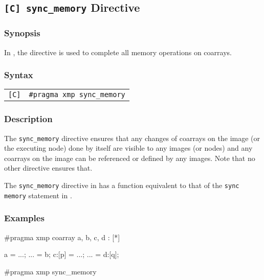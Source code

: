 \subsection{{\tt [C] sync\_memory} Directive}

\subsubsection*{Synopsis}

In {\XMPC}, the  directive is used to complete
all memory operations on coarrays.

\subsubsection*{Syntax}

\begin{tabular}{ll}
\verb![C]! & \verb|#pragma xmp sync_memory| \\
\end{tabular}

\subsubsection*{Description}


The {\tt sync\_memory} directive ensures that any changes of coarrays
on the image (or the executing node) done by itself are visible to any
images (or nodes) and any coarrays on the image can be referenced or
defined by any images.
%
Note that no other {\XMP} directive ensures that.

The {\tt sync\_memory} directive in {\XMPC} has a function equivalent
to that of the {\tt sync memory} statement in {\XMPF}.

\subsubsection*{Examples}

\begin{XCexample}
#pragma xmp coarray a, b, c, d : [*]

a = ...;
... = b;
c:[p] = ...;
... = d:[q];

#pragma xmp sync_memory
\end{XCexample}

